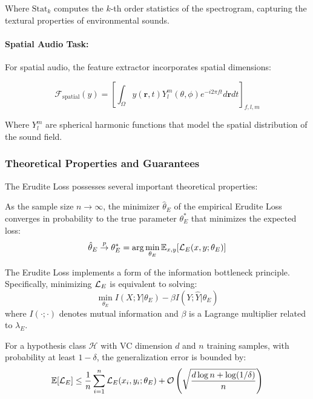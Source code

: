 Where $\text{Stat}_k$ computes the $k$-th order statistics of the spectrogram, capturing the textural properties of environmental sounds.

\paragraph{Spatial Audio Task:}
For spatial audio, the feature extractor incorporates spatial dimensions:

\begin{equation}
\mathcal{F}_{\text{spatial}}(y) = \left[ \int_{\Omega} y(\mathbf{r},t) Y_l^m(\theta, \phi) e^{-i2\pi ft} d\mathbf{r}dt \right]_{f,l,m}
\end{equation}

Where $Y_l^m$ are spherical harmonic functions that model the spatial distribution of the sound field.

\subsubsection{Theoretical Properties and Guarantees}

The Erudite Loss possesses several important theoretical properties:

\begin{theorem}
As the sample size $n \to \infty$, the minimizer $\hat{\theta}_E$ of the empirical Erudite Loss converges in probability to the true parameter $\theta_E^*$ that minimizes the expected loss:
\begin{equation}
\hat{\theta}_E \stackrel{p}{\to} \theta_E^* = \arg\min_{\theta_E} \mathbb{E}_{x,y}[\mathcal{L}_E(x, y; \theta_E)]
\end{equation}
\end{theorem}

\begin{theorem}
The Erudite Loss implements a form of the information bottleneck principle. Specifically, minimizing $\mathcal{L}_E$ is equivalent to solving:
\begin{equation}
\min_{\theta_E} I(X;Y|\theta_E) - \beta I(Y;\hat{Y}|\theta_E)
\end{equation}
where $I(\cdot;\cdot)$ denotes mutual information and $\beta$ is a Lagrange multiplier related to $\lambda_E$.
\end{theorem}

\begin{theorem}
For a hypothesis class $\mathcal{H}$ with VC dimension $d$ and $n$ training samples, with probability at least $1-\delta$, the generalization error is bounded by:
\begin{equation}
\mathbb{E}[\mathcal{L}_E] \leq \frac{1}{n}\sum_{i=1}^n \mathcal{L}_E(x_i, y_i; \theta_E) + \mathcal{O}\left(\sqrt{\frac{d \log n + \log(1/\delta)}{n}}\right)
\end{equation}
\end{theorem}

